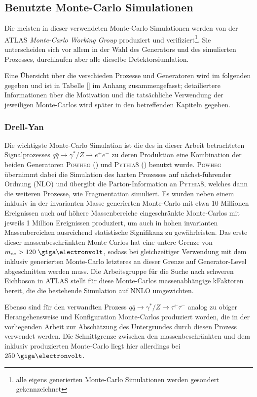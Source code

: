 \subsection{Benutzte Monte-Carlo Simulationen}
\label{used_mc_samples}
Die meisten in dieser verwendeten Monte-Carlo Simulationen werden von der ATLAS
\textit{Monte-Carlo Working Group} produziert und verifiziert\footnote{alle
eigens generierten Monte-Carlo Simulationen werden gesondert gekennzeichnet}.
Sie unterscheiden sich vor allem in der Wahl des Generators und des simulierten
Prozesses, durchlaufen aber alle dieselbe Detektorsiumlation.

Eine Übersicht über die verschieden Prozesse und Generatoren wird im folgenden
gegeben und ist in Tabelle \ref{} im Anhang zusammengefasst; detailiertere
Informationen über die Motivation und die tatsächliche Verwendung der jeweiligen
Monte-Carlos wird später in den betreffenden Kapiteln gegeben.

\subsubsection*{Drell-Yan}
Die wichtigste Monte-Carlo Simulation ist die des in dieser Arbeit betrachteten
Signalprozesses $q\bar q \rightarrow \gamma^*/Z \rightarrow e^+e^-$ zu deren
Produktion eine Kombination der beiden Generatoren \textsc{Powheg}
(\cite{Alioli:2010xd}) und \textsc{Pythia8} (\cite{Sjostrand:2007gs}) benutzt
wurde. \textsc{Powheg} übernimmt dabei die Simulation des harten Prozesses auf
nächst-führender Ordnung (NLO) und übergibt die Parton-Information an
\textsc{Pythia8}, welches dann die weiteren Prozesse, wie Fragmentation
simuliert. Es wurden neben einem inklusiv in der invarianten Masse generierten
Monte-Carlo mit etwa 10 Millionen Ereignissen auch auf höhere Massenbereiche
eingeschränkte Monte-Carlos mit jeweils 1 Million Ereignissen produziert, um
auch in hohen invarianten Massenbereichen ausreichend statistische Signifikanz
zu gewährleisten. Das erste dieser massenbeschränkten Monte-Carlos hat eine
untere Grenze von $m_{ee} > 120 \GeV$, sodass bei gleichzeitiger Verwendung mit
dem inklusiv generierten Monte-Carlo letzteres an dieser Grenze auf
Generator-Level abgeschnitten werden muss. Die Arbeitsgruppe für die Suche
nach schweren Eichboson in ATLAS stellt für diese Monte-Carlos massenabhängige
kFaktoren bereit, die die bestehende Simulation auf NNLO umgewichten.

Ebenso sind für den verwandten Prozess
$q\bar q \rightarrow \gamma^*/Z \rightarrow \tau^+\tau^-$ analog zu obiger 
Herangehensweise und Konfiguration Monte-Carlos produziert worden, die in
der vorliegenden Arbeit zur Abschätzung des Untergrundes durch diesen Prozess
verwendet werden. Die Schnittgrenze zwischen den massenbeschränkten und dem
inklusiv produzierten Monte-Carlo liegt hier allerdings bei $250 \GeV$.

